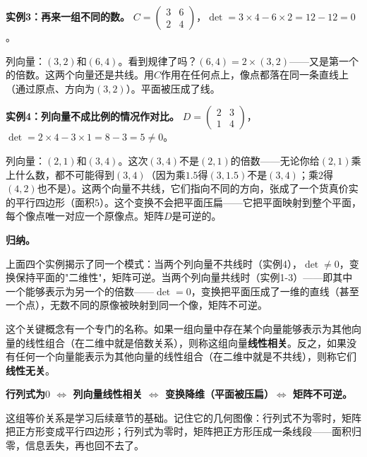 \vspace{0.2cm}
\noindent\textbf{实例3：再来一组不同的数。}
$C=\begin{pmatrix}3&6\\2&4\end{pmatrix}$，$\det=3\times4-6\times2=12-12=0$。

列向量：$(3,2)$和$(6,4)$。看到规律了吗？$(6,4)=2\times(3,2)$——又是第一个的倍数。这两个向量还是共线。用$C$作用在任何点上，像点都落在同一条直线上（通过原点、方向为$(3,2)$）。平面被压成了线。

\vspace{0.2cm}
\noindent\textbf{实例4：列向量不成比例的情况作对比。}
$D=\begin{pmatrix}2&3\\1&4\end{pmatrix}$，$\det=2\times4-3\times1=8-3=5\neq0$。

列向量：$(2,1)$和$(3,4)$。这次$(3,4)$不是$(2,1)$的倍数——无论你给$(2,1)$乘上什么数，都不可能得到$(3,4)$（因为乘$1.5$得$(3,1.5)$不是$(3,4)$；乘$2$得$(4,2)$也不是）。这两个向量不共线，它们指向不同的方向，张成了一个货真价实的平行四边形（面积$5$）。这个变换不会把平面压扁——它把平面映射到整个平面，每个像点唯一对应一个原像点。矩阵$D$是可逆的。

\vspace{0.2cm}
\noindent\textbf{归纳。}

上面四个实例揭示了同一个模式：当两个列向量不共线时（实例4），$\det\neq0$，变换保持平面的"二维性"，矩阵可逆。当两个列向量共线时（实例1-3）——即其中一个能够表示为另一个的倍数——$\det=0$，变换把平面压成了一维的直线（甚至一个点），无数不同的原像被映射到同一个像，矩阵不可逆。

这个关键概念有一个专门的名称。如果一组向量中存在某个向量能够表示为其他向量的线性组合（在二维中就是倍数关系），则称这组向量\textbf{线性相关}。反之，如果没有任何一个向量能表示为其他向量的线性组合（在二维中就是不共线），则称它们\textbf{线性无关}。

\textbf{行列式为$0$ $\Longleftrightarrow$ 列向量线性相关 $\Longleftrightarrow$ 变换降维（平面被压扁）$\Longleftrightarrow$ 矩阵不可逆。}

这组等价关系是学习后续章节的基础。记住它的几何图像：行列式不为零时，矩阵把正方形变成平行四边形；行列式为零时，矩阵把正方形压成一条线段——面积归零，信息丢失，再也回不去了。


